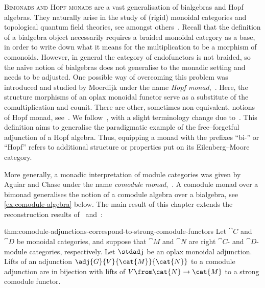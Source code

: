\textsc{Bimonads and Hopf monads} are a vast generalisation of bialgebras and Hopf algebras.
They naturally arise in the study of (rigid) monoidal categories and topological quantum field theories,
see amongst others~\cite{Kerler2001, Moerdijk2002, Bruguieres2007, Bruguieres2011, Turaev2017}.
Recall that the definition of a bialgebra object necessarily requires
a braided monoidal category as a base,
in order to write down what it means for the multiplication to be a morphism of comonoids.
However, in general the category of endofunctors is not braided,
so the naïve notion of bialgebras does not generalise to the monadic setting and needs to be adjusted.
One possible way of overcoming this problem was introduced and studied by Moerdijk under the name
\emph{Hopf monad},~\cite{Moerdijk2002}.
Here, the structure morphisms of
an oplax monoidal functor
serve as a substitute of the comultiplication and counit.
There are other, sometimes non-equivalent, notions of Hopf monad,
see~\cite{Boardman1995,Mesablishvili2011}.
We follow~\cite{Moerdijk2002},
with a slight terminology change due to~\cite{Bruguieres2007,Bruguieres2011}.
This definition aims to generalise the paradigmatic example of the free–forgetful adjunction of a Hopf algebra.
Thus, equipping a monad with the prefixes ``bi-'' or ``Hopf''
refers to additional structure or properties put on its Eilenberg–Moore category.

More generally, a monadic interpretation of module categories was given by Aguiar and Chase under the name \emph{comodule monad},~\cite{Aguiar2012}.
A comodule monad over a bimonad generalises the notion of a comodule algebra over a bialgebra,
see \cref{ex:comodule-algebra} below.
The main result of this chapter extends the reconstruction results
of~\cite[Proposition~4.1.2]{Aguiar2012} and~\cite[Lemma~7.10]{Turaev2017}:

\begin{reptheorem}{thm:comodule-adjunctions-correspond-to-strong-comodule-functors}
  Let \(\cat{C}\) and \(\cat{D}\) be monoidal categories,
  and suppose that \(\cat{M}\) and \(\cat{N}\) are right \(\cat{C}\)\hyp{} and \(\cat{D}\)\hyp{}module categories, respectively.
  Let \(\stdadj\) be an oplax monoidal adjunction.
  Lifts of an adjunction \(\adj{G}{V}{\cat{M}}{\cat{N}}\) to a comodule adjunction are in bijection with lifts of \(V \from \cat{N} \to \cat{M}\) to a strong comodule functor.
\end{reptheorem}

